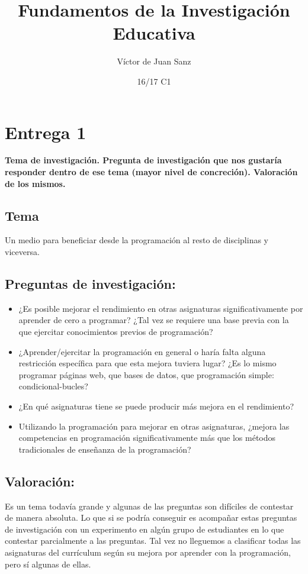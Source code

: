 \documentclass[palatino]{apuntesURJC}
\title{Fundamentos de la Investigación Educativa}
\author{Víctor de Juan Sanz}
\date{16/17 C1}
\begin{document}
\pagestyle{plain}
\maketitle

\tableofcontents
\newpage


\chapter{Entrega 1}

\textbf{Tema de investigación. 
%
Pregunta de investigación que nos gustaría responder dentro de ese tema (mayor nivel de concreción).
%
Valoración de los mismos.}

\section{Tema} Un medio para beneficiar desde la programación al resto de disciplinas y viceversa.

\section{Preguntas de investigación: }

\begin{itemize}
\item ¿Es posible mejorar el rendimiento en otras asignaturas significativamente por aprender de cero a programar? ¿Tal vez se requiere una base previa con la que ejercitar conocimientos previos de programación?
\item ¿Aprender/ejercitar la programación en general o haría falta alguna restricción específica para que esta mejora tuviera lugar? ¿Es lo mismo programar páginas web, que bases de datos, que programación simple: condicional-bucles?
\item ¿En qué asignaturas tiene se puede producir más mejora en el rendimiento?
\item Utilizando la programación para mejorar en otras asignaturas, ¿mejora las competencias en programación significativamente más que los métodos tradicionales de enseñanza de la programación?
\end{itemize}

\section{Valoración:} Es un tema todavía grande y algunas de las preguntas son difíciles de contestar de manera absoluta. 
%
Lo que si se podría conseguir es acompañar estas preguntas de investigación con un experimento en algún grupo de estudiantes en lo que contestar parcialmente a las preguntas. 
%
Tal vez no lleguemos a clasificar todas las asignaturas del currículum según su mejora por aprender con la programación, pero sí algunas de ellas.
\end{document}
